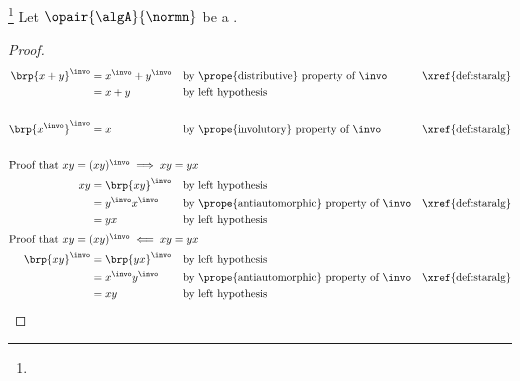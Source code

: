 \begin{theorem}
\footnote{
  }
\label{thm:nalg_hermitian}
  
Let $\opair{\algA}{\normn}$ be a  .
\end{theorem}
\begin{proof}
\begin{align*}
  \brp{ x+ y}^\invo
    &=  x^\invo +  y^\invo
    && \text{by \prope{distributive} property of $\invo$}
    && \text{\xref{def:staralg}}
  \\&=  x +  y
    && \text{by left hypothesis}
  \\\\
  \brp{ x^\invo}^\invo
    &=  x
    && \text{by \prope{involutory} property of $\invo$}
    && \text{\xref{def:staralg}}
  \\\\
  \intertext{Proof that $ x y=( x y)^\invo \implies  x y= y x$}
   x y
    &= \brp{ x y}^\invo
    && \text{by left hypothesis}
  \\&=  y^\invo x^\invo
    && \text{by \prope{antiautomorphic} property of $\invo$}
    && \text{\xref{def:staralg}}
  \\&=  y x
    && \text{by left hypothesis}
  \\
  \intertext{Proof that $ x y=( x y)^\invo \impliedby  x y= y x$}
  \brp{ x y}^\invo
    &= \brp{ y x}^\invo
    && \text{by left hypothesis}
  \\&=  x^\invo y^\invo
    && \text{by \prope{antiautomorphic} property of $\invo$}
    && \text{\xref{def:staralg}}
  \\&=  x y
    && \text{by left hypothesis}
\end{align*}
\end{proof}


